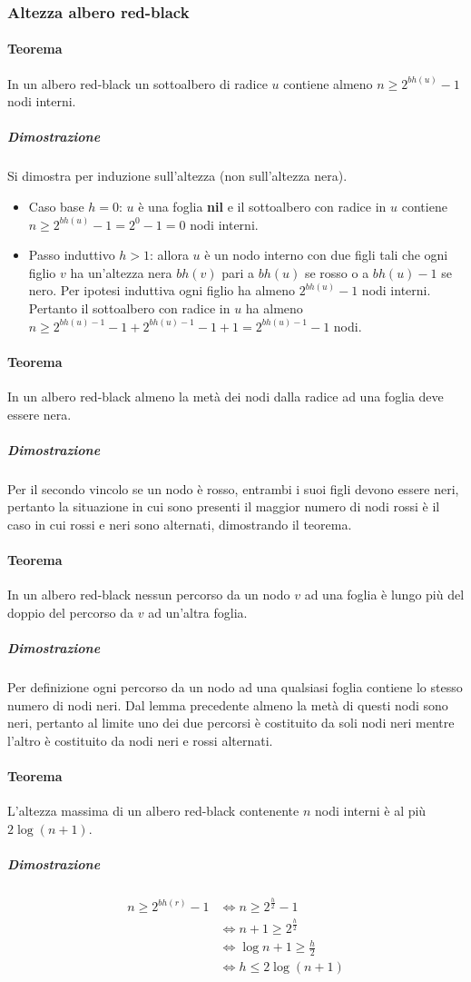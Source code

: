 \subsubsection{Altezza albero red-black}
\paragraph{Teorema}
In un albero red-black un sottoalbero di radice $u$ contiene almeno $n\ge 2^{bh(u)}-1$ nodi interni.
\subparagraph{Dimostrazione}
Si dimostra per induzione sull'altezza (non sull'altezza nera).
\begin{itemize}
    \item Caso base $h=0$: $u$ \`e una foglia \textbf{nil} e il sottoalbero con radice in $u$ contiene $n\ge 2^{bh(u)}-1= 2^0-1=0$ nodi interni.
    \item Passo induttivo $h>1$: allora $u$ \`e un nodo interno con due figli tali che ogni figlio $v$ ha un'altezza nera $bh(v)$ pari a $bh(u)$ se rosso o
          a $bh(u)-1$ se nero. Per ipotesi induttiva ogni figlio ha almeno $2^{bh(u)}-1$ nodi interni. Pertanto il sottoalbero con radice in $u$ ha almeno $n\ge
              2^{bh(u)-1}-1+2^{bh(u)-1}-1+1=2^{bh(u)-1}-1$ nodi.
\end{itemize}
\paragraph{Teorema}
In un albero red-black almeno la met\`a dei nodi dalla radice ad una foglia deve essere nera.
\subparagraph{Dimostrazione}
Per il secondo vincolo se un nodo \`e rosso, entrambi i suoi figli devono essere neri, pertanto la situazione in cui sono presenti il maggior numero di nodi
rossi \`e il caso in cui rossi e neri sono alternati, dimostrando il teorema.
\paragraph{Teorema}
In un albero red-black nessun percorso da un nodo $v$ ad una foglia \`e lungo pi\`u del doppio del percorso da $v$ ad un'altra foglia.
\subparagraph{Dimostrazione}
Per definizione ogni percorso da un nodo ad una qualsiasi foglia contiene lo stesso numero di nodi neri. Dal lemma precedente almeno la met\`a di questi
nodi sono neri, pertanto al limite uno dei due percorsi \`e costituito da soli nodi neri mentre l'altro \`e costituito da nodi neri e rossi alternati.
\paragraph{Teorema}
L'altezza massima di un albero red-black contenente $n$ nodi interni \`e al pi\`u $2\log(n+1)$.
\subparagraph{Dimostrazione}
\begin{align*}
    n\ge 2^{bh(r)}-1 & \Leftrightarrow n\ge 2^{\frac{h}{2}}-1   \\
                     & \Leftrightarrow n+1\ge 2^{\frac{h}{2}}   \\
                     & \Leftrightarrow \log{n+1}\ge \frac{h}{2} \\
                     & \Leftrightarrow h\le 2\log(n+1)
\end{align*}
